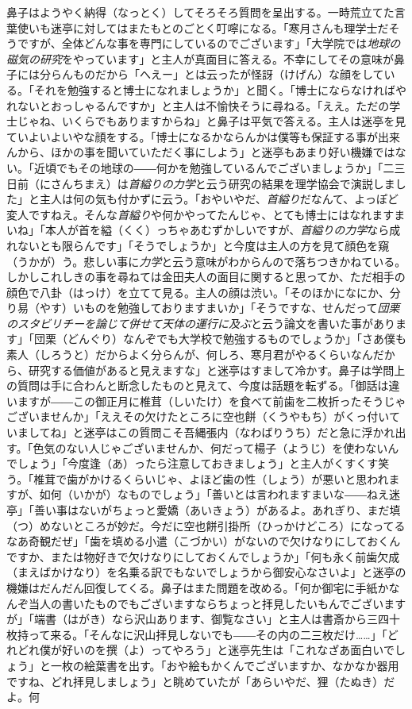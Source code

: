 \documentclass{book}
\begin{document}
鼻子はようやく納得（なっとく）してそろそろ質問を呈出する。一時荒立てた言葉使いも迷亭に対してはまたもとのごとく叮嚀になる。「寒月さんも理学士だそうですが、全体どんな事を専門にしているのでございます」「大学院では\emph{地球の磁気の研究}をやっています」と主人が真面目に答える。不幸にしてその意味が鼻子には分らんものだから「へえー」とは云ったが怪訝（けげん）な顔をしている。「それを勉強すると博士になれましょうか」と聞く。「博士にならなければやれないとおっしゃるんですか」と主人は不愉快そうに尋ねる。「ええ。ただの学士じゃね、いくらでもありますからね」と鼻子は平気で答える。主人は迷亭を見ていよいよいやな顔をする。「博士になるかならんかは僕等も保証する事が出来んから、ほかの事を聞いていただく事にしよう」と迷亭もあまり好い機嫌ではない。「近頃でもその地球の――何かを勉強しているんでございましょうか」「二三日前（にさんちまえ）は\emph{首縊りの力学}と云う研究の結果を理学協会で演説しました」と主人は何の気も付かずに云う。「おやいやだ、\emph{首縊り}だなんて、よっぽど変人ですねえ。そんな\emph{首縊り}や何かやってたんじゃ、とても博士にはなれますまいね」「本人が首を縊（くく）っちゃあむずかしいですが、\emph{首縊りの力学}なら成れないとも限らんです」「そうでしょうか」と今度は主人の方を見て顔色を窺（うかが）う。悲しい事に\emph{力学}と云う意味がわからんので落ちつきかねている。しかしこれしきの事を尋ねては金田夫人の面目に関すると思ってか、ただ相手の顔色で八卦（はっけ）を立てて見る。主人の顔は渋い。「そのほかになにか、分り易（やす）いものを勉強しておりますまいか」「そうですな、せんだって\emph{団栗のスタビリチーを論じて併せて天体の運行に及ぶ}と云う論文を書いた事があります」「団栗（どんぐり）なんぞでも大学校で勉強するものでしょうか」「さあ僕も素人（しろうと）だからよく分らんが、何しろ、寒月君がやるくらいなんだから、研究する価値があると見えますな」と迷亭はすまして冷かす。鼻子は学問上の質問は手に合わんと断念したものと見えて、今度は話題を転ずる。「御話は違いますが――この御正月に椎茸（しいたけ）を食べて前歯を二枚折ったそうじゃございませんか」「ええその欠けたところに空也餅（くうやもち）がくっ付いていましてね」と迷亭はこの質問こそ吾縄張内（なわばりうち）だと急に浮かれ出す。「色気のない人じゃございませんか、何だって楊子（ようじ）を使わないんでしょう」「今度逢（あ）ったら注意しておきましょう」と主人がくすくす笑う。「椎茸で歯がかけるくらいじゃ、よほど歯の性（しょう）が悪いと思われますが、如何（いかが）なものでしょう」「善いとは言われますまいな――ねえ迷亭」「善い事はないがちょっと愛嬌（あいきょう）があるよ。あれぎり、まだ填（つ）めないところが妙だ。今だに空也餅引掛所（ひっかけどころ）になってるなあ奇観だぜ」「歯を填める小遣（こづかい）がないので欠けなりにしておくんですか、または物好きで欠けなりにしておくんでしょうか」「何も永く前歯欠成（まえばかけなり）を名乗る訳でもないでしょうから御安心なさいよ」と迷亭の機嫌はだんだん回復してくる。鼻子はまた問題を改める。「何か御宅に手紙かなんぞ当人の書いたものでもございますならちょっと拝見したいもんでございますが」「端書（はがき）なら沢山あります、御覧なさい」と主人は書斎から三四十枚持って来る。「そんなに沢山拝見しないでも――その内の二三枚だけ\ldots{}\ldots{}」「どれどれ僕が好いのを撰（よ）ってやろう」と迷亭先生は「これなざあ面白いでしょう」と一枚の絵葉書を出す。「おや絵もかくんでございますか、なかなか器用ですね、どれ拝見しましょう」と眺めていたが「あらいやだ、狸（たぬき）だよ。何
\end{document}
